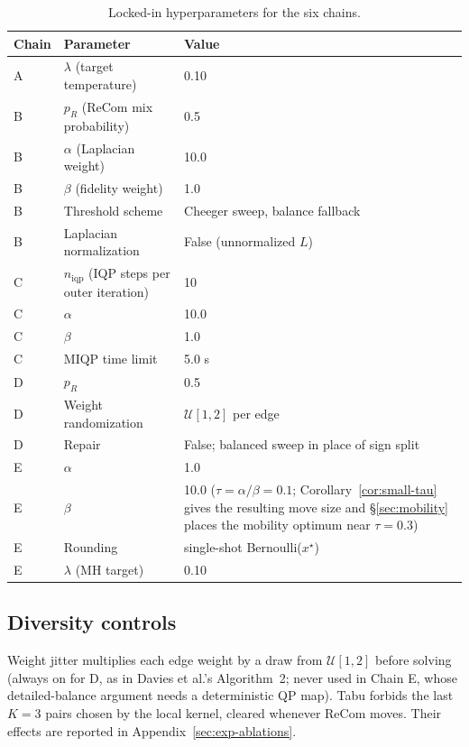 \documentclass[11pt]{article}
\begin{document}
\begin{table}[H]
\centering
\small
\begin{tabular}{lll}
\toprule
Chain & Parameter & Value \\
\midrule
A & $\lambda$ (target temperature) & 0.10 \\
B & $p_R$ (ReCom mix probability) & 0.5 \\
B & $\alpha$ (Laplacian weight) & 10.0 \\
B & $\beta$ (fidelity weight) & 1.0 \\
B & Threshold scheme & Cheeger sweep, balance fallback \\
B & Laplacian normalization & False (unnormalized $L$) \\
C & $n_{\mathrm{iqp}}$ (IQP steps per outer iteration) & 10 \\
C & $\alpha$ & 10.0 \\
C & $\beta$ & 1.0 \\
C & MIQP time limit & 5.0 s \\
D & $p_R$ & 0.5 \\
D & Weight randomization & $\mathcal{U}[1, 2]$ per edge \\
D & Repair & False; balanced sweep in place of sign split \\
E & $\alpha$ & 1.0 \\
E & $\beta$ & 10.0 ($\tau = \alpha/\beta = 0.1$; Corollary~\ref{cor:small-tau} gives the resulting move size and \S\ref{sec:mobility} places the mobility optimum near $\tau = 0.3$) \\
E & Rounding & single-shot Bernoulli($x^\star$) \\
E & $\lambda$ (MH target) & 0.10 \\
\bottomrule
\end{tabular}
\caption{Locked-in hyperparameters for the six
  chains.}\label{tab:hyperparams}
\end{table}

\subsection{Diversity controls}\label{app:diversity}

Weight jitter multiplies each edge weight by a draw from
$\mathcal{U}[1, 2]$ before solving (always on for D, as in Davies et
al.'s Algorithm~2; never used in Chain E, whose detailed-balance
argument needs a deterministic QP map). Tabu forbids the last $K = 3$
pairs chosen by the local kernel, cleared whenever ReCom moves.
Their effects are reported in Appendix~\ref{sec:exp-ablations}.
\end{document}

